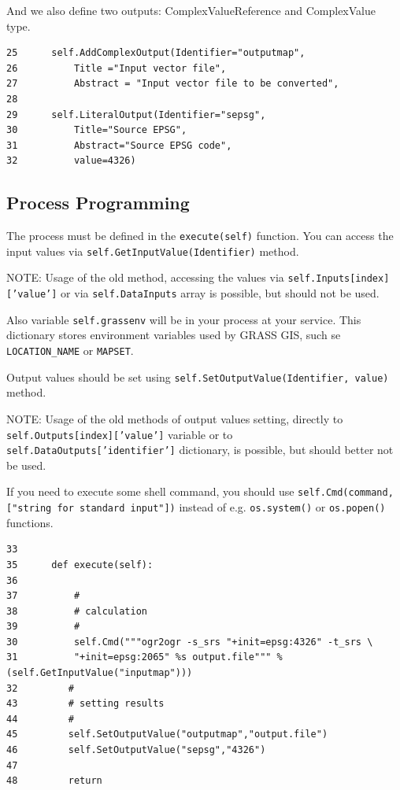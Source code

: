 \documentclass[a4paper,11pt]{article}
\newcommand{\note}[1]{\medskip{}\noindent{}NOTE: #1\medskip{}}
\begin{document}
And we also define two outputs: ComplexValueReference and ComplexValue
type.


\begin{verbatim}
25      self.AddComplexOutput(Identifier="outputmap",
26          Title ="Input vector file",
27          Abstract = "Input vector file to be converted",
28
29      self.LiteralOutput(Identifier="sepsg",
30          Title="Source EPSG",
31          Abstract="Source EPSG code",
32          value=4326) 
\end{verbatim}


\subsection{Process Programming}
    
The process must be defined in the \texttt{execute(self)} function. You can
access the input values via \texttt{self.GetInputValue(Identifier)} method.

\note{Usage of the old method, accessing the values via
\texttt{self.Inputs[index]['value']} or via \texttt{self.DataInputs} array
is possible, but should not be used.}

Also variable \texttt{self.grassenv} will be in your process at your
service. This dictionary stores environment variables used by GRASS GIS,
such se \texttt{LOCATION\_NAME} or \texttt{MAPSET}.

Output values should be set using \texttt{self.SetOutputValue(Identifier,
value)} method.

\note{Usage of the old methods of output values setting, directly to 
\texttt{self.Outputs[index]['value']} variable or to
\texttt{self.DataOutputs['identifier']} dictionary, is possible, but should
better not be used.}

If you need to execute some shell command, you should use
\texttt{self.Cmd(command,["string for standard input"])} instead of e.g.
\texttt{os.system()} or \texttt{os.popen()} functions.


\begin{verbatim}
33
35      def execute(self):
36          
37          #
38          # calculation
39          #
30          self.Cmd("""ogr2ogr -s_srs "+init=epsg:4326" -t_srs \
31          "+init=epsg:2065" %s output.file""" % (self.GetInputValue("inputmap")))
32         #
43         # setting results
44         #
45         self.SetOutputValue("outputmap","output.file")
46         self.SetOutputValue("sepsg","4326")
47
48         return
\end{verbatim}
\end{document}
